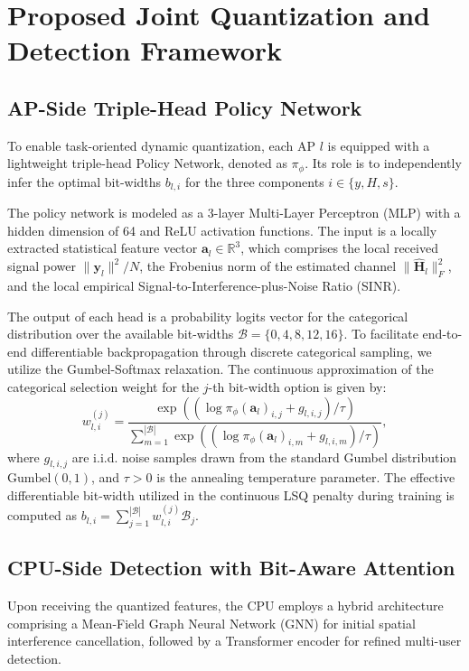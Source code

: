 \section{Proposed Joint Quantization and Detection Framework}

\subsection{AP-Side Triple-Head Policy Network}
To enable task-oriented dynamic quantization, each AP $l$ is equipped with a lightweight triple-head Policy Network, denoted as $\pi_\phi$. Its role is to independently infer the optimal bit-widths $b_{l,i}$ for the three components $i \in \{y, H, s\}$. 

The policy network is modeled as a 3-layer Multi-Layer Perceptron (MLP) with a hidden dimension of 64 and ReLU activation functions. The input is a locally extracted statistical feature vector $\mathbf{a}_l \in \mathbb{R}^{3}$, which comprises the local received signal power $\|\mathbf{y}_l\|^2/N$, the Frobenius norm of the estimated channel $\|\hat{\mathbf{H}}_l\|_F^2$, and the local empirical Signal-to-Interference-plus-Noise Ratio (SINR).

The output of each head is a probability logits vector for the categorical distribution over the available bit-widths $\mathcal{B} = \{0, 4, 8, 12, 16\}$. To facilitate end-to-end differentiable backpropagation through discrete categorical sampling, we utilize the Gumbel-Softmax relaxation. The continuous approximation of the categorical selection weight for the $j$-th bit-width option is given by:
\begin{equation}
    w_{l,i}^{(j)} = \frac{\exp((\log \pi_\phi(\mathbf{a}_l)_{i,j} + g_{l,i,j})/\tau)}{\sum_{m=1}^{|\mathcal{B}|} \exp((\log \pi_\phi(\mathbf{a}_l)_{i,m} + g_{l,i,m})/\tau)},
\end{equation}
where $g_{l,i,j}$ are i.i.d. noise samples drawn from the standard Gumbel distribution $\text{Gumbel}(0,1)$, and $\tau > 0$ is the annealing temperature parameter. The effective differentiable bit-width utilized in the continuous LSQ penalty during training is computed as $b_{l,i} = \sum_{j=1}^{|\mathcal{B}|} w_{l,i}^{(j)} \mathcal{B}_j$.

\subsection{CPU-Side Detection with Bit-Aware Attention}
Upon receiving the quantized features, the CPU employs a hybrid architecture comprising a Mean-Field Graph Neural Network (GNN) for initial spatial interference cancellation, followed by a Transformer encoder for refined multi-user detection.

